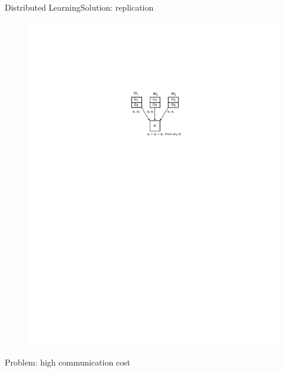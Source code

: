 \documentclass{beamer}
\begin{document}
\begin{frame}{Distributed Learning}{Solution: replication}

\begin{figure}
    \centering
    \includegraphics[height=.7\textheight]{res/replicate.pdf}
\end{figure}

Problem: high communication cost

\end{frame}
\end{document}
